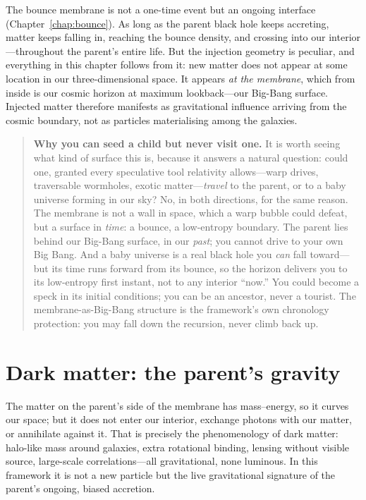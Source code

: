 The bounce membrane is not a one-time event but an ongoing interface
(Chapter~\ref{chap:bounce}). As long as the parent black hole keeps accreting,
matter keeps falling in, reaching the bounce density, and crossing into our
interior---throughout the parent's entire life. But the injection geometry is
peculiar, and everything in this chapter follows from it: new matter does not
appear at some location in our three-dimensional space. It appears \emph{at the
membrane}, which from inside is our cosmic horizon at maximum lookback---our
Big-Bang surface. Injected matter therefore manifests as gravitational influence
arriving from the cosmic boundary, not as particles materialising among the
galaxies.

\begin{quote}\small
\textbf{Why you can seed a child but never visit one.} It is worth seeing what
kind of surface this is, because it answers a natural question: could one, granted
every speculative tool relativity allows---warp drives, traversable wormholes,
exotic matter---\emph{travel} to the parent, or to a baby universe forming in our
sky? No, in both directions, for the same reason. The membrane is not a wall in
space, which a warp bubble could defeat, but a surface in \emph{time}: a bounce, a
low-entropy boundary. The parent lies behind our Big-Bang surface, in our
\emph{past}; you cannot drive to your own Big Bang. And a baby universe is a real
black hole you \emph{can} fall toward---but its time runs forward from its bounce,
so the horizon delivers you to its low-entropy first instant, not to any interior
``now.'' You could become a speck in its initial conditions; you can be an
ancestor, never a tourist. The membrane-as-Big-Bang structure is the framework's
own chronology protection: you may fall down the recursion, never climb back up.
\end{quote}

\section{Dark matter: the parent's gravity}
\label{sec:dark-matter}

The matter on the parent's side of the membrane has mass--energy, so it curves our
space; but it does not enter our interior, exchange photons with our matter, or
annihilate against it. That is precisely the phenomenology of dark matter:
halo-like mass around galaxies, extra rotational binding, lensing without visible
source, large-scale correlations---all gravitational, none luminous. In this
framework it is not a new particle but the live gravitational signature of the
parent's ongoing, biased accretion.

